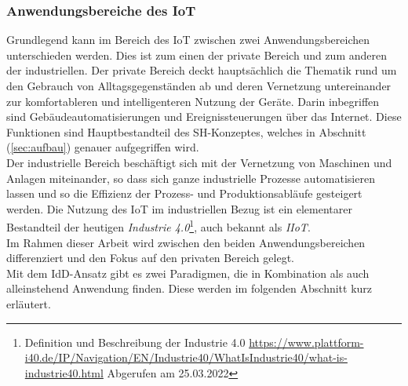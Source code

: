     \subsubsection*{Anwendungsbereiche des \acs{IoT}}
        Grundlegend kann im Bereich des \acl{IoT} zwischen zwei Anwendungsbereichen unterschieden werden. Dies ist zum einen der private Bereich und zum 
        anderen der industriellen. Der private Bereich deckt hauptsächlich die Thematik rund um den Gebrauch von Alltagsgegenständen ab und 
        deren Vernetzung untereinander zur komfortableren und intelligenteren Nutzung der Geräte. Darin inbegriffen sind 
        Gebäudeautomatisierungen und Ereignissteuerungen über das Internet. Diese Funktionen sind Hauptbestandteil des \acl{SH}-Konzeptes, welches 
        in Abschnitt (\ref{sec:aufbau}) genauer aufgegriffen wird. 
        \\
        \linebreak
        Der industrielle Bereich beschäftigt sich mit der Vernetzung von Maschinen und Anlagen miteinander, so dass sich ganze industrielle Prozesse 
        automatisieren lassen und so die Effizienz der Prozess- und Produktionsabläufe gesteigert werden. Die Nutzung des \acs{IoT} im industriellen Bezug 
        ist ein elementarer Bestandteil der heutigen \textit{Industrie 4.0}\footnote{Definition und Beschreibung der Industrie 4.0 \url{https://www.plattform-i40.de/IP/Navigation/EN/Industrie40/WhatIsIndustrie40/what-is-industrie40.html} Abgerufen am 25.03.2022},
        auch bekannt als \textit{\ac{IIoT}}. 
        \\
        Im Rahmen dieser Arbeit wird zwischen den beiden Anwendungsbereichen 
        differenziert und den Fokus auf den privaten Bereich gelegt. 
        \\
        \linebreak
        Mit dem \acl{IdD}-Ansatz gibt es zwei Paradigmen, die in Kombination als auch alleinstehend Anwendung finden. Diese werden im folgenden Abschnitt kurz erläutert.


